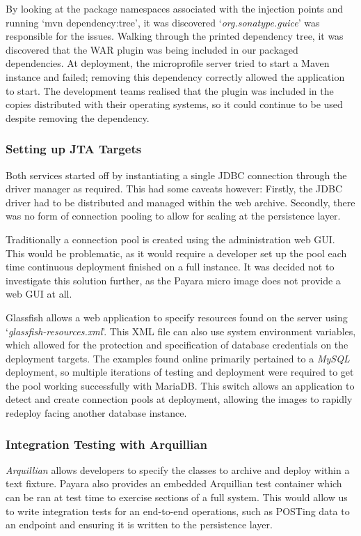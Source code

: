 By looking at the package namespaces associated with the injection points and running `mvn dependency:tree', it was discovered `\textit{org.sonatype.guice}' was responsible for the issues. Walking through the printed dependency tree, it was discovered that the WAR plugin was being included in our packaged dependencies. At deployment, the microprofile server tried to start a Maven instance and failed; removing this dependency correctly allowed the application to start. The development teams realised that the plugin was included in the copies distributed with their operating systems, so it could continue to be used despite removing the dependency.

\label{JTA_Targets}
\subsubsection{Setting up JTA Targets}
Both services started off by instantiating a single JDBC connection through the driver manager as required. This had some caveats however: Firstly, the JDBC driver had to be distributed and managed within the web archive. Secondly, there was no form of connection pooling to allow for scaling at the persistence layer.

Traditionally a connection pool is created using the administration web GUI. This would be problematic, as it would require a developer set up the pool each time continuous deployment finished on a full instance.  It was decided not to investigate this solution further, as the Payara micro image does not provide a web GUI at all.

Glassfish allows a web application to specify resources found on the server using `\textit{glassfish-resources.xml}'. This XML file can also use system environment variables, which allowed for the protection and specification of database credentials on the deployment targets. The examples found online primarily pertained to a \textit{MySQL} deployment, so multiple iterations of testing and deployment were required to get the pool working successfully with MariaDB. This switch allows an application to detect and create connection pools at deployment, allowing the images to rapidly redeploy facing another database instance.

\subsubsection{Integration Testing with Arquillian}
\textit{Arquillian}\cite{Arquillian} allows developers to specify the classes to archive and deploy within a text fixture. Payara also provides an embedded Arquillian test container which can be ran at test time to exercise sections of a full system. This would allow us to write integration tests for an end-to-end operations, such as POSTing data to an endpoint and ensuring it is written to the persistence layer.

